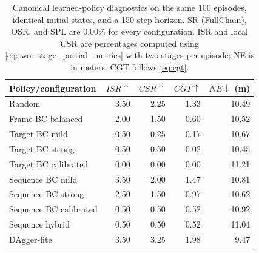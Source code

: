\begin{table}[pos=t]
\centering
\caption{Canonical learned-policy diagnostics on the same 100 episodes, identical initial states, and a 150-step horizon. SR (FullChain), OSR, and SPL are 0.00\% for every configuration. ISR and local CSR are percentages computed using \eqref{eq:two_stage_partial_metrics} with two stages per episode; NE is in meters. CGT follows \eqref{eq:cgt}.}
\label{tab:agent_diagnostics}
\label{tab:agent_diagnostic}
\label{tab:agent_behavior_diagnostics}
\setlength{\tabcolsep}{3pt}
\renewcommand{\arraystretch}{1.06}
\small
\begin{tabular}{@{}lrrrr@{}}
\hline
Policy/configuration & $ISR\uparrow$ & $CSR\uparrow$ & $CGT\uparrow$ & $NE\downarrow$ (m) \\
\hline
Random & 3.50 & 2.25 & 1.33 & 10.49 \\
Frame BC balanced & 2.00 & 1.50 & 0.60 & 10.52 \\
Target BC mild & 0.50 & 0.25 & 0.17 & 10.67 \\
Target BC strong & 0.50 & 0.50 & 0.02 & 10.45 \\
Target BC calibrated & 0.00 & 0.00 & 0.00 & 11.21 \\
Sequence BC mild & 3.50 & 2.00 & 1.47 & 10.81 \\
Sequence BC strong & 2.50 & 1.50 & 0.97 & 10.62 \\
Sequence BC calibrated & 0.50 & 0.50 & 0.52 & 10.92 \\
Sequence hybrid & 0.50 & 0.50 & 0.52 & 11.04 \\
DAgger-lite & 3.50 & 3.25 & 1.98 & 9.47 \\
\hline
\end{tabular}
\end{table}
